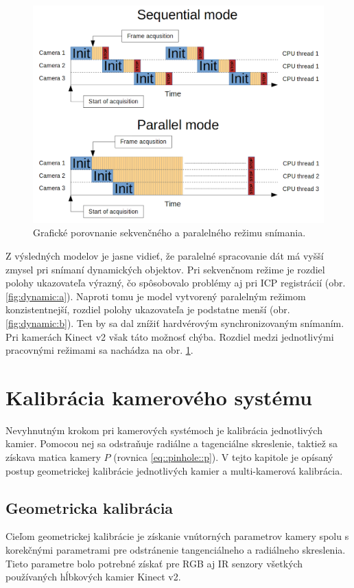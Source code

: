 \begin{figure}[H]
	\centering
	\includegraphics[width=\textwidth]{figures/scanning_mode.png}
	\caption{Grafické porovnanie sekvenčného a paralelného režimu snímania.}
	\label{fig:parallel_sequence}
\end{figure}

Z výsledných modelov je jasne vidieť, že paralelné spracovanie dát má vyšší zmysel pri snímaní dynamických objektov. Pri sekvenčnom režime je rozdiel polohy ukazovateľa výrazný, čo spôsobovalo problémy aj pri ICP registrácií (obr. \ref{fig:dynamic:a}). Naproti tomu je model vytvorený paralelným režimom konzistentnejší, rozdiel polohy ukazovateľa je podstatne menší (obr. \ref{fig:dynamic:b}). Ten by sa dal znížiť hardvérovým synchronizovaným snímaním. Pri kamerách Kinect v2 však táto možnosť chýba. Rozdiel medzi jednotlivými pracovnými režimami sa nachádza na obr. \ref{fig:parallel_sequence}. 

\section{Kalibrácia kamerového systému}
\label{sec:kinect_calib}

Nevyhnutným krokom pri kamerových systémoch je kalibrácia jednotlivých kamier. Pomocou nej sa odstraňuje radiálne a tagenciálne skreslenie, taktiež sa získava matica kamery $P$ (rovnica \ref{eq::pinhole::p}). V tejto kapitole je opísaný postup geometrickej kalibrácie jednotlivých kamier a multi-kamerová kalibrácia. 

\subsection{Geometricka kalibrácia}
Cieľom geometrickej kalibrácie je získanie vnútorných parametrov  kamery spolu s korekčnými parametrami pre odstránenie tangenciálneho a radiálneho skreslenia. Tieto parametre bolo potrebné získať pre RGB aj IR senzory všetkých používaných hĺbkových kamier Kinect v2. 

